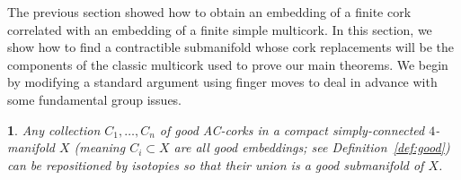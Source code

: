 \documentclass[11pt]{amsart}
\newcommand{\thistheoremname}{}
\newtheorem{genericthm}[theorem]{\thistheoremname}
\newenvironment{namedtheorem}[1]
  {\renewcommand{\thistheoremname}{#1}%
   \begin{genericthm}}
  {\end{genericthm}}
\theoremstyle{definition}
\newcommand{\defref}[1]{Definition~\ref{#1}}
\newcommand{\medcup}{\mbox{\larger$\cup$}}
\newcommand{\ac}{\textup{AC}}
\newcommand{\overbar}[1]{\mkern 1mu\overline{\mkern-2.5mu#1\mkern-1mu}\mkern 1mu}
\begin{document}
The previous section showed how to obtain an embedding of a finite cork correlated with an embedding of a finite simple multicork. In this section, we show how to find a contractible submanifold whose cork replacements will be the components of the classic multicork used to prove our main theorems.  We begin by modifying a standard argument using finger moves to deal in advance with some fundamental group issues. 

\def\X{\overbar X}
\def\Q{\medcup C_i}



\begin{namedtheorem}{Finger Lemma} \label{lem:finger}
\it Any collection $C_1,\dots,C_n$ of good \ac-corks in a compact simply-connected $4$-manifold $X$ \textup{(meaning $C_i\subset X$ are all good embeddings; see \defref{def:good})} can be repositioned by isotopies so that their union is a good submanifold of $X$.
\end{namedtheorem}  

  
 
\end{document}
